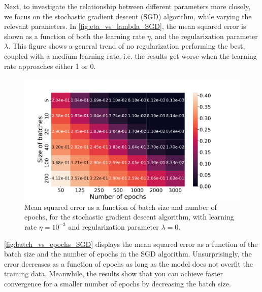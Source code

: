\documentclass[12pt]{article}
\begin{document}
Next, to investigate the relationship between different parameters more closely, we focus on the stochastic gradient descent (SGD) algorithm, while varying the relevant parameters. In \autoref{fig:eta_vs_lambda_SGD}, the mean squared error is shown as a function of both the learning rate $\eta$, and the regularization parameter $\lambda$. This figure shows a general trend of no regularization performing the best, coupled with a medium learning rate, i.e. the results get worse when the learning rate approaches either 1 or 0. 

\begin{figure}
    \centering
    \includegraphics[width=0.91\linewidth]{images/batch_vs_epochs_SGD.pdf}
    \caption{Mean squared error as a function of batch size and number of epochs, for the stochastic gradient descent algorithm, with learning rate $\eta = 10^{-3}$ and regularization parameter $\lambda = 0$.}
    \label{fig:batch_vs_epochs_SGD}
\end{figure}

\autoref{fig:batch_vs_epochs_SGD} displays the mean squared error as a function of the batch size and the number of epochs in the SGD algorithm. Unsurprisingly, the error decreases as a function of epochs as long as the model does not overfit the training data. Meanwhile, the results show that you can achieve faster convergence for a smaller number of epochs by decreasing the batch size.%
\end{document}
